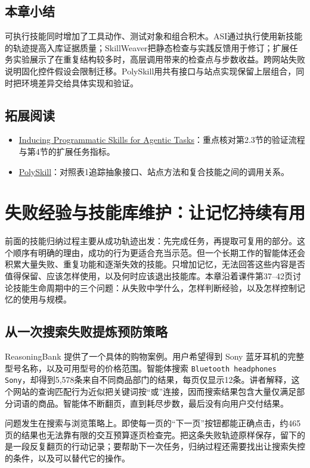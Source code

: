 \documentclass[11pt,a4paper]{article}
\begin{document}
\subsection{本章小结}
可执行技能同时增加了工具动作、测试对象和组合积木。ASI通过执行使用新技能的轨迹提高入库证据质量；SkillWeaver把静态检查与实践反馈用于修订；扩展任务实验展示了在重复结构较多时，高层调用带来的检查点与步数收益。跨网站失败说明固化控件假设会限制迁移。PolySkill用共有接口与站点实现保留上层组合，同时把环境差异交给具体实现和验证。

\subsection{拓展阅读}
\begin{itemize}
\item \href{https://arxiv.org/abs/2504.06821}{Inducing Programmatic Skills for Agentic Tasks}：重点核对第2.3节的验证流程与第4节的扩展任务指标。
\item \href{https://arxiv.org/abs/2510.15863}{PolySkill}：对照表1追踪抽象接口、站点方法和复合技能之间的调用关系。
\end{itemize}


\clearpage
\section{失败经验与技能库维护：让记忆持续有用}

前面的技能归纳过程主要从成功轨迹出发：先完成任务，再提取可复用的部分。这个顺序有明确的理由，成功的行为更适合充当示范。但一个长期工作的智能体还会积累大量失败、重复功能和逐渐失效的技能。只增加记忆，无法回答这些内容是否值得保留、应该怎样使用，以及何时应该退出技能库。本章沿着课件第37--42页讨论技能生命周期中的三个问题：从失败中学什么，怎样判断经验，以及怎样控制记忆的使用与规模。

\subsection{从一次搜索失败提炼预防策略}

ReasoningBank 提供了一个具体的购物案例。用户希望得到 Sony 蓝牙耳机的完整型号名称，以及可用型号的价格范围。智能体搜索 \texttt{Bluetooth headphones Sony}，却得到5,578条来自不同商品部门的结果，每页仅显示12条。讲者解释，这个网站的查询匹配行为近似把关键词按“或”连接，因而搜索结果包含大量仅满足部分词语的商品。智能体不断翻页，直到耗尽步数，最后没有向用户交付结果。

问题发生在搜索与浏览策略上。即使每一页的“下一页”按钮都能正确点击，约465页的结果也无法靠有限的交互预算逐页检查完。把这条失败轨迹原样保存，留下的是一段反复翻页的行动记录；要帮助下一次任务，归纳过程还需要找出让搜索失控的条件，以及可以替代它的操作。
\end{document}

